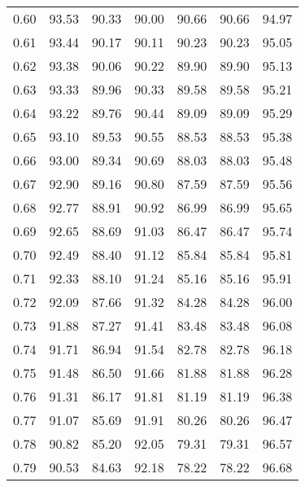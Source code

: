 \begin{tabular}{|c|c|c|c|c|c|c|}
      0.60 &     93.53 &     90.33 &      90.00 &   90.66 &      90.66 &         94.97 \\
      0.61 &     93.44 &     90.17 &      90.11 &   90.23 &      90.23 &         95.05 \\
      0.62 &     93.38 &     90.06 &      90.22 &   89.90 &      89.90 &         95.13 \\
      0.63 &     93.33 &     89.96 &      90.33 &   89.58 &      89.58 &         95.21 \\
      0.64 &     93.22 &     89.76 &      90.44 &   89.09 &      89.09 &         95.29 \\
      0.65 &     93.10 &     89.53 &      90.55 &   88.53 &      88.53 &         95.38 \\
      0.66 &     93.00 &     89.34 &      90.69 &   88.03 &      88.03 &         95.48 \\
      0.67 &     92.90 &     89.16 &      90.80 &   87.59 &      87.59 &         95.56 \\
      0.68 &     92.77 &     88.91 &      90.92 &   86.99 &      86.99 &         95.65 \\
      0.69 &     92.65 &     88.69 &      91.03 &   86.47 &      86.47 &         95.74 \\
      0.70 &     92.49 &     88.40 &      91.12 &   85.84 &      85.84 &         95.81 \\
      0.71 &     92.33 &     88.10 &      91.24 &   85.16 &      85.16 &         95.91 \\
      0.72 &     92.09 &     87.66 &      91.32 &   84.28 &      84.28 &         96.00 \\
      0.73 &     91.88 &     87.27 &      91.41 &   83.48 &      83.48 &         96.08 \\
      0.74 &     91.71 &     86.94 &      91.54 &   82.78 &      82.78 &         96.18 \\
      0.75 &     91.48 &     86.50 &      91.66 &   81.88 &      81.88 &         96.28 \\
      0.76 &     91.31 &     86.17 &      91.81 &   81.19 &      81.19 &         96.38 \\
      0.77 &     91.07 &     85.69 &      91.91 &   80.26 &      80.26 &         96.47 \\
      0.78 &     90.82 &     85.20 &      92.05 &   79.31 &      79.31 &         96.57 \\
      0.79 &     90.53 &     84.63 &      92.18 &   78.22 &      78.22 &         96.68 \\

\end{tabular}
